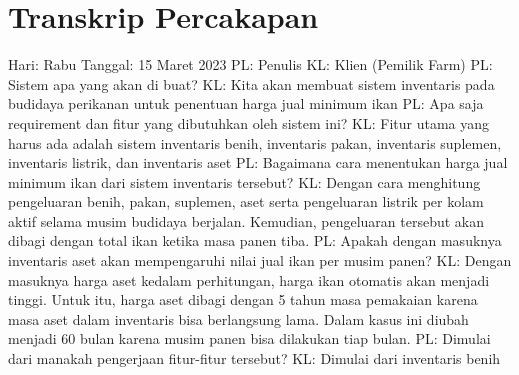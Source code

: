 \appendix
\chapter {Transkrip Percakapan}
\begin{flushleft}
Hari: Rabu
\linebreak
Tanggal: 15 Maret 2023
\linebreak
PL: Penulis
\linebreak
KL: Klien (Pemilik Farm)
\linebreak
\linebreak
PL: Sistem apa yang akan di buat?
\linebreak
KL: Kita akan membuat sistem inventaris pada budidaya perikanan untuk penentuan harga jual minimum ikan
\linebreak
PL: Apa saja requirement dan fitur yang dibutuhkan oleh sistem ini?
\linebreak
KL: Fitur utama yang harus ada adalah sistem inventaris benih, inventaris pakan, inventaris suplemen, inventaris listrik, dan inventaris aset
\linebreak
PL: Bagaimana cara menentukan harga jual minimum ikan dari sistem inventaris tersebut?
\linebreak
KL: Dengan cara menghitung pengeluaran benih, pakan, suplemen, aset serta pengeluaran listrik per kolam aktif selama musim budidaya berjalan. Kemudian, pengeluaran tersebut akan dibagi dengan total ikan ketika masa panen tiba.
\linebreak
PL: Apakah dengan masuknya inventaris aset akan mempengaruhi nilai jual ikan per musim panen?
\linebreak
KL: Dengan masuknya harga aset kedalam perhitungan, harga ikan otomatis akan menjadi tinggi. Untuk itu, harga aset dibagi dengan 5 tahun masa pemakaian karena masa aset dalam inventaris bisa berlangsung lama. Dalam kasus ini diubah menjadi 60 bulan karena musim panen bisa dilakukan tiap bulan.
\linebreak
PL: Dimulai dari manakah pengerjaan fitur-fitur tersebut?
\linebreak
KL: Dimulai dari inventaris benih
\end{flushleft}